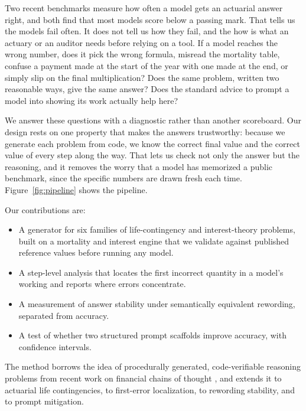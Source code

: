 \documentclass{article}
\begin{document}
Two recent benchmarks measure how often a model gets an actuarial answer right, and both find that most models score below a passing mark. That tells us the models fail often. It does not tell us how they fail, and the how is what an actuary or an auditor needs before relying on a tool. If a model reaches the wrong number, does it pick the wrong formula, misread the mortality table, confuse a payment made at the start of the year with one made at the end, or simply slip on the final multiplication? Does the same problem, written two reasonable ways, give the same answer? Does the standard advice to prompt a model into showing its work \citep{wei2022cot} actually help here?

We answer these questions with a diagnostic rather than another scoreboard. Our design rests on one property that makes the answers trustworthy: because we generate each problem from code, we know the correct final value and the correct value of every step along the way. That lets us check not only the answer but the reasoning, and it removes the worry that a model has memorized a public benchmark, since the specific numbers are drawn fresh each time. Figure~\ref{fig:pipeline} shows the pipeline.

Our contributions are:
\begin{itemize}
\item A generator for six families of life-contingency and interest-theory problems, built on a mortality and interest engine that we validate against published reference values before running any model.
\item A step-level analysis that locates the first incorrect quantity in a model's working and reports where errors concentrate.
\item A measurement of answer stability under semantically equivalent rewording, separated from accuracy.
\item A test of whether two structured prompt scaffolds improve accuracy, with confidence intervals.
\end{itemize}
The method borrows the idea of procedurally generated, code-verifiable reasoning problems from recent work on financial chains of thought \citep{finchain2025}, and extends it to actuarial life contingencies, to first-error localization, to rewording stability, and to prompt mitigation.
\end{document}
